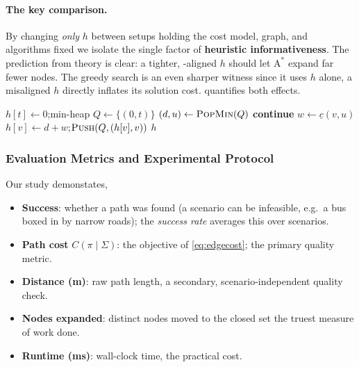 \documentclass{ai-lab-report}
\begin{document}
\paragraph{The key comparison.}
By changing \emph{only} $h$ between setups holding the cost model, graph, and algorithms fixed 
we isolate the single factor of \textbf{heuristic informativeness}. The prediction from theory is clear: a tighter, 
-aligned $h$ should let $\text{A}^\ast$ expand far fewer nodes. The greedy search is an even sharper witness 
since it uses $h$ alone, a misaligned $h$ directly inflates its solution cost.  quantifies both effects.

\begin{algorithm}[H]
\caption{Setup~1: admissible heuristic $h$ via reverse Dijkstra over per-edge lower bounds $\underline{c}(\cdot)$.}
\label{alg:revdijkstra}
\begin{algorithmic}[1]
\State $h[t]\gets 0$;\quad min-heap $Q\gets\{(0,t)\}$
  \State $(d,u)\gets\textsc{PopMin}(Q)$
   \textbf{continue}
  \EndIf
   
    \State $w\gets\underline{c}(v,u)$ 
     \State $h[v]\gets d+w$;\quad $\textsc{Push}(Q,(h[v],v))$
    \EndIf
  \EndFor
\EndWhile
\State \Return $h$ 
\end{algorithmic}
\end{algorithm}


\subsubsection{Evaluation Metrics and Experimental Protocol}
\label{sec:a1metrics}
Our study demonstates,
\begin{itemize}
  \item \textbf{Success}: whether a path was found (a scenario can be infeasible, e.g.\ a bus boxed in by narrow roads); the \emph{success rate} averages this over scenarios.
  \item \textbf{Path cost} $C(\pi\mid\Sigma)$: the objective of \cref{eq:edgecost}; the primary quality metric.
  \item \textbf{Distance (m)}: raw path length, a secondary, scenario-independent quality check.
  \item \textbf{Nodes expanded}: distinct nodes moved to the closed set the truest measure of work done.
  \item \textbf{Runtime (ms)}: wall-clock time, the practical cost.
\end{itemize}
\end{document}
